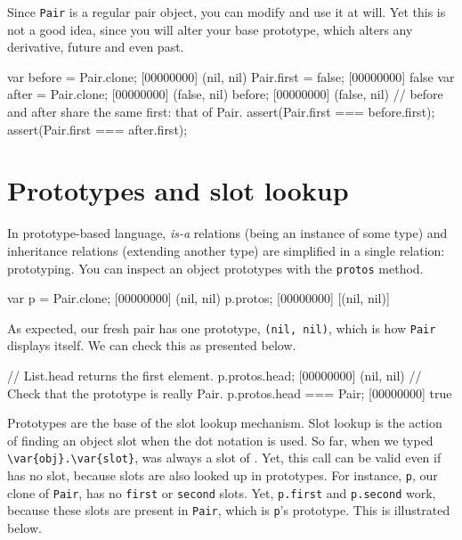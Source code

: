 Since \lstinline|Pair| is a regular pair object, you can modify and
use it at will. Yet this is not a good idea, since you will alter your
base prototype, which alters any derivative, future and even past.

\begin{urbiscript}
var before = Pair.clone;
[00000000] (nil, nil)
Pair.first = false;
[00000000] false
var after = Pair.clone;
[00000000] (false, nil)
before;
[00000000] (false, nil)
// before and after share the same first: that of Pair.
assert(Pair.first === before.first);
assert(Pair.first === after.first);
\end{urbiscript}

\section{Prototypes and slot lookup}

In prototype-based language, \emph{is-a} relations (being an instance
of some type) and inheritance relations (extending another type) are
simplified in a single relation: prototyping. You can inspect an
object prototypes with the \lstinline{protos} method.

\begin{urbiscript}[firstnumber=1]
var p = Pair.clone;
[00000000] (nil, nil)
p.protos;
[00000000] [(nil, nil)]
\end{urbiscript}

As expected, our fresh pair has one prototype, \lstinline|(nil, nil)|,
which is how \lstinline|Pair| displays itself. We can check this as
presented below.

\begin{urbiscript}
// List.head returns the first element.
p.protos.head;
[00000000] (nil, nil)
// Check that the prototype is really Pair.
p.protos.head === Pair;
[00000000] true
\end{urbiscript}

Prototypes are the base of the slot lookup mechanism. Slot lookup is
the action of finding an object slot when the dot notation is used.
So far, when we typed
\lstinline|\var{obj}.\var{slot}|,  was always a slot of
.  Yet, this call can be valid even if  has no
 slot, because slots are also looked up in prototypes. For
instance, \lstinline|p|, our clone of \lstinline|Pair|, has no
\lstinline|first| or \lstinline|second| slots. Yet,
\lstinline|p.first| and \lstinline|p.second| work, because these slots
are present in \lstinline|Pair|, which is \lstinline|p|'s
prototype. This is illustrated below.

